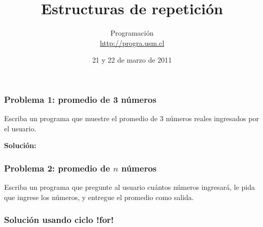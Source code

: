\documentclass[12pt]{beamer}
\title{Estructuras de repetición}
\author{Programación \\ \url{http://progra.usm.cl}}
\date{21 y 22 de marzo de 2011}
\begin{document}
  \begin{frame}
    \maketitle
  \end{frame}

  \begin{frame}
    \frametitle{Problema 1: promedio de 3 números}

    Escriba un programa que muestre el promedio de 3 números reales
    ingresados por el usuario.
    
    

    \vfill
    \textbf{Solución:}
    
  \end{frame}
  

  \begin{frame}
    \frametitle{Problema 2: promedio de \(n\) números}

    Escriba un programa que pregunte al usuario
    cuántos números ingresará,
    le pida que ingrese los números,
    y entregue el promedio como salida.

    
  \end{frame}
  
  
  \begin{frame}
    \frametitle{Solución usando ciclo \li!for!}

    
  \end{frame}
\end{document}
